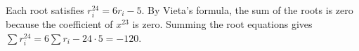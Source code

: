 Each root satisfies $r_i^{24}=6r_i-5$. By Vieta's formula, the sum of the roots is zero because the coefficient of $x^{23}$ is zero. Summing the root equations gives $\sum r_i^{24}=6\sum r_i-24\cdot5=\boxed{-120}$.

